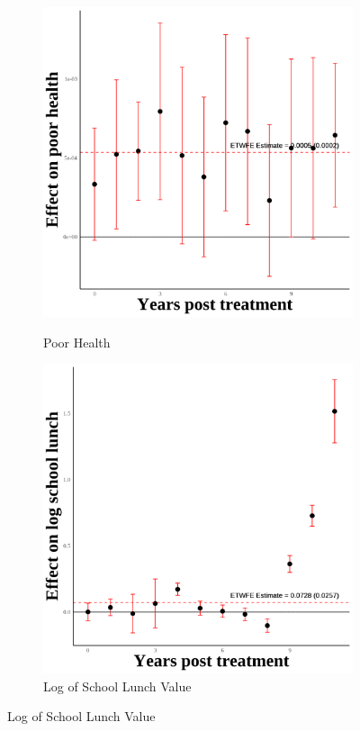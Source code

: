 \documentclass[12pt,english]{article}
\begin{document}
\pagebreak


\begin{figure}[H]
  \caption{Effect of Immigration Enforcement on Children's Outcomes: Second Generation}
  \centering

  \begin{subfigure}[b]{0.3\textwidth}
    \centering
    \caption{Poor Health}
    \includegraphics[width=\linewidth]{figures/plot17-poor_health_event_study-second.png}
    \label{fig:poor-health-second}
  \end{subfigure}
  \hfill
  \begin{subfigure}[b]{0.3\textwidth}
    \centering
    \caption{Log of School Lunch Value}
    \includegraphics[width=\linewidth]{figures/plot18-ln_schl_lunch_event_study-second.png}

\end{subfigure}
\end{figure}
\end{document}
